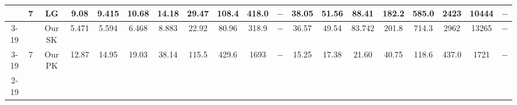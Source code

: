 \begin{table}[]
{\begin{tabular}{|c|c|c|cccccccccccccccc|}
& \multirow{3}{*}{7} & LG & \multicolumn{1}{c|}{9.08} & \multicolumn{1}{c|}{9.415} & \multicolumn{1}{c|}{10.68} & \multicolumn{1}{c|}{14.18} & \multicolumn{1}{c|}{29.47} & \multicolumn{1}{c|}{108.4} & \multicolumn{1}{c|}{418.0} & \multicolumn{1}{c|}{$-$} & \multicolumn{1}{c|}{38.05} & \multicolumn{1}{c|}{51.56} & \multicolumn{1}{c|}{88.41} & \multicolumn{1}{c|}{182.2} & \multicolumn{1}{c|}{585.0} & \multicolumn{1}{c|}{2423} & \multicolumn{1}{c|}{10444} & $-$ \\ \cline{3-19} 
 &  & Our SK & \multicolumn{1}{c|}{\cellcolor{blue!30}5.471} & \multicolumn{1}{c|}{\cellcolor{blue!30}5.594} & \multicolumn{1}{c|}{\cellcolor{blue!30}6.468} & \multicolumn{1}{c|}{\cellcolor{blue!30}8.883} & \multicolumn{1}{c|}{\cellcolor{blue!30}22.92} & \multicolumn{1}{c|}{\cellcolor{blue!30}80.96} & \multicolumn{1}{c|}{\cellcolor{blue!30}318.9} & \multicolumn{1}{c|}{$-$} & \multicolumn{1}{c|}{36.57} & \multicolumn{1}{c|}{49.54} & \multicolumn{1}{c|}{83.742} & \multicolumn{1}{c|}{201.8} & \multicolumn{1}{c|}{714.3} & \multicolumn{1}{c|}{2962} & \multicolumn{1}{c|}{13265} & $-$ \\ \cline{3-19} 
 & \multirow{-3}{*}{7} & Our PK & \multicolumn{1}{c|}{12.87} & \multicolumn{1}{c|}{14.95} & \multicolumn{1}{c|}{19.03} & \multicolumn{1}{c|}{38.14} & \multicolumn{1}{c|}{115.5} & \multicolumn{1}{c|}{429.6} & \multicolumn{1}{c|}{1693} & \multicolumn{1}{c|}{$-$} & \multicolumn{1}{c|}{\cellcolor{blue!30}15.25} & \multicolumn{1}{c|}{\cellcolor{blue!30}17.38} & \multicolumn{1}{c|}{\cellcolor{blue!30}21.60} & \multicolumn{1}{c|}{\cellcolor{blue!30}40.75} & \multicolumn{1}{c|}{\cellcolor{blue!30}118.6} & \multicolumn{1}{c|}{\cellcolor{blue!30}437.0} & \multicolumn{1}{c|}{\cellcolor{blue!30}1721} & $-$ \\ \cline{2-19} 


\end{tabular}}
\end{table}
